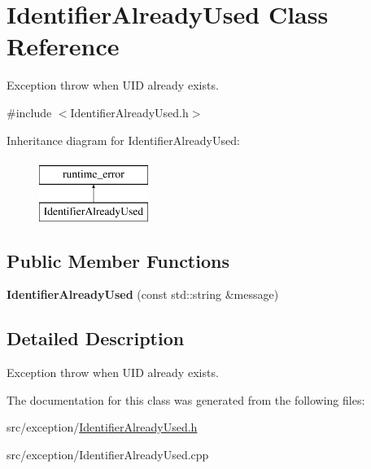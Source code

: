 \hypertarget{class_identifier_already_used}{\section{Identifier\-Already\-Used Class Reference}
\label{class_identifier_already_used}
}


Exception throw when U\-I\-D already exists.  




{\ttfamily \#include $<$Identifier\-Already\-Used.\-h$>$}

Inheritance diagram for Identifier\-Already\-Used\-:\begin{figure}[H]
\begin{center}
\leavevmode
\includegraphics[height=2.000000cm]{class_identifier_already_used}
\end{center}
\end{figure}
\subsection*{Public Member Functions}
\begin{DoxyCompactItemize}
\item 
\hypertarget{class_identifier_already_used_abe365803ccbb04a9ea34c33212d623da}{{\bfseries Identifier\-Already\-Used} (const std\-::string \&message)}\label{class_identifier_already_used_abe365803ccbb04a9ea34c33212d623da}

\end{DoxyCompactItemize}


\subsection{Detailed Description}
Exception throw when U\-I\-D already exists. 

The documentation for this class was generated from the following files\-:\begin{DoxyCompactItemize}
\item 
src/exception/\hyperlink{_identifier_already_used_8h}{Identifier\-Already\-Used.\-h}\item 
src/exception/Identifier\-Already\-Used.\-cpp\end{DoxyCompactItemize}
